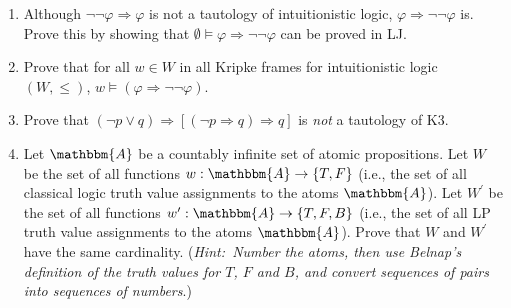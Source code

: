 \documentclass[11pt]{article}
\theoremstyle{definition}
\theoremstyle{remark}
\begin{document}
\begin{enumerate}
    \item Although $\neg\neg\varphi\Rightarrow\varphi$ is not a tautology of intuitionistic logic, $\varphi\Rightarrow\neg\neg\varphi$ is. Prove this by showing that $\emptyset\vDash\varphi\Rightarrow\neg\neg\varphi$ can be proved in LJ.

    \item Prove that for all $w\in W$ in all Kripke frames for intuitionistic logic $(W,\leq)$, $w\vDash(\varphi\Rightarrow\neg\neg\varphi)$.

    \item Prove that $(\neg p \vee q)\Rightarrow [(\neg p\Rightarrow q)\Rightarrow q]$ is \textit{not} a tautology of K3. 

    \item Let $\mathbbm{A}$ be a countably infinite set of atomic propositions. Let $W$ be the set of all functions $w:\mathbbm{A}\rightarrow\{T,F\}$ (i.e., the set of all classical logic truth value assignments to the atoms $\mathbbm{A}$). Let $W^{\prime}$ be the set of all functions $w^{\prime}:\mathbbm{A}\rightarrow\{T,F,B\}$ (i.e., the set of all LP truth value assignments to the atoms $\mathbbm{A}$). Prove that $W$ and $W^{\prime}$ have the same cardinality. (\textit{Hint:\ Number the atoms, then use Belnap's definition of the truth values for $T$, $F$ and $B$, and convert sequences of pairs into sequences of numbers}.)
\end{enumerate}
\end{document}
